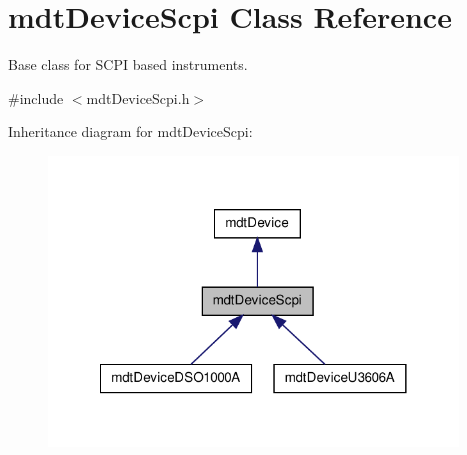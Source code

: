 \hypertarget{classmdt_device_scpi}{
\section{mdtDeviceScpi Class Reference}
\label{classmdt_device_scpi}
}


Base class for SCPI based instruments.  




{\ttfamily \#include $<$mdtDeviceScpi.h$>$}



Inheritance diagram for mdtDeviceScpi:\nopagebreak
\begin{figure}[H]
\begin{center}
\leavevmode
\includegraphics[width=308pt]{classmdt_device_scpi__inherit__graph}
\end{center}
\end{figure}


